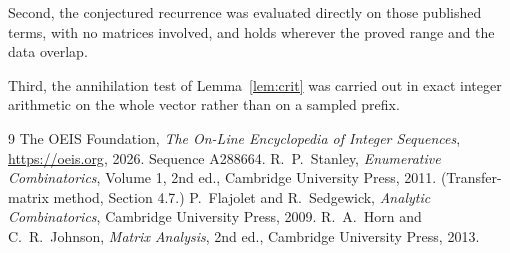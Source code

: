 \documentclass[11pt,a4paper]{article}
\theoremstyle{plain}
\theoremstyle{definition}
\begin{document}
Second, the conjectured recurrence was evaluated directly on those published terms, with no
matrices involved, and holds wherever the proved range and the data overlap.

Third, the annihilation test of Lemma~\ref{lem:crit} was carried out in exact integer
arithmetic on the whole vector rather than on a sampled prefix.

\begin{thebibliography}{9}
 The OEIS Foundation, \emph{The On-Line Encyclopedia of Integer
Sequences}, \url{https://oeis.org}, 2026. Sequence A288664.
 R.~P.~Stanley, \emph{Enumerative Combinatorics}, Volume 1, 2nd ed.,
Cambridge University Press, 2011. (Transfer-matrix method, Section 4.7.)
 P.~Flajolet and R.~Sedgewick, \emph{Analytic Combinatorics}, Cambridge
University Press, 2009.
 R.~A.~Horn and C.~R.~Johnson, \emph{Matrix Analysis}, 2nd ed., Cambridge
University Press, 2013.
\end{thebibliography}
\end{document}
